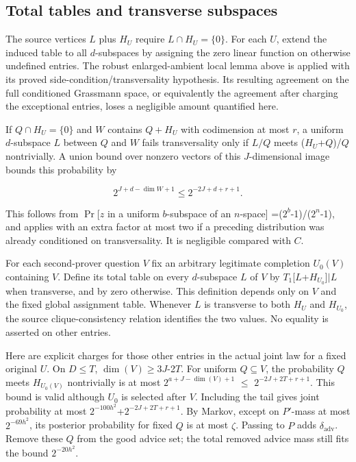 \subsection{Total tables and transverse subspaces}
The source vertices \(L\) plus \(H_U\) require \(L\cap H_U=\{0\}\). For each \(U\), extend the induced table to all \(d\)-subspaces by assigning the zero linear function on otherwise undefined entries. The robust enlarged-ambient local lemma above is applied with its proved side-condition/transversality hypothesis. Its resulting agreement on the full conditioned Grassmann space, or equivalently the agreement after charging the exceptional entries, loses a negligible amount quantified here.

If \(Q\cap H_U=\{0\}\) and \(W\) contains \(Q+H_U\) with codimension at most \(r\), a uniform \(d\)-subspace \(L\) between \(Q\) and \(W\) fails transversality only if \(L/Q\) meets (\(H_U\)+\(Q\))/\(Q\) nontrivially. A union bound over nonzero vectors of this \(J\)-dimensional image bounds this probability by

\begin{equation}\label{eq:16}
2^{J+d-\dim W+1}\le2^{-2J+d+r+1}.
\end{equation}

This follows from \(\Pr\)[\(z\) in a uniform \(b\)-subspace of an \(n\)-space] =(\(2^b\)-1)/(\(2^n\)-1), and applies with an extra factor at most two if a preceding distribution was already conditioned on transversality. It is negligible compared with \(C\).

For each second-prover question \(V\) fix an arbitrary legitimate completion \(U_0(V)\) containing \(V\). Define its total table on every \(d\)-subspace \(L\) of \(V\) by \(T_1\)[\(L\)+\(H_{U_0}\)]\(\mid\)\(L\) when transverse, and by zero otherwise. This definition depends only on \(V\) and the fixed global assignment table. Whenever \(L\) is transverse to both \(H_U\) and \(H_{U_0}\), the source clique-consistency relation identifies the two values. No equality is asserted on other entries.

Here are explicit charges for those other entries in the actual joint law for a fixed original \(U\). On \(D\)\(\le\)\(T\), \(\dim(V)\)\(\ge\)3\(J\)-2\(T\). For uniform \(Q\subseteq V\), the probability \(Q\) meets \(H_{U_0(V)}\) nontrivially is at most \(2^{a+J-\dim(V)+1}\) \(\le\) \(2^{-2J+2T+r+1}\). This bound is valid although \(U_0\) is selected after \(V\). Including the tail gives joint probability at most \(2^{-100h^2}\)+\(2^{-2J+2T+r+1}\). By Markov, except on \(P'\)-mass at most \(2^{-69h^2}\), its posterior probability for fixed \(Q\) is at most \(\zeta\). Passing to \(P\) adds \(\delta_{\mathrm{adv}}\). Remove these \(Q\) from the good advice set; the total removed advice mass still fits the bound \(2^{-20h^2}\).

